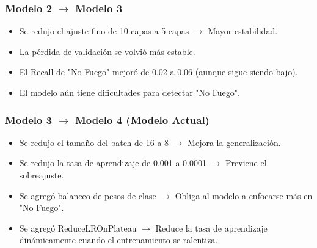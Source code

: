 \subsubsection{Modelo 2 $\rightarrow$ Modelo 3}
\begin{itemize}
    \item Se redujo el ajuste fino de 10 capas a 5 capas $\rightarrow$ Mayor estabilidad.
    \item La pérdida de validación se volvió más estable.
    \item El Recall de "No Fuego" mejoró de 0.02 a 0.06 (aunque sigue siendo bajo).
    \item El modelo aún tiene dificultades para detectar "No Fuego".
\end{itemize}

\subsubsection{Modelo 3 $\rightarrow$ Modelo 4 (Modelo Actual)}
\begin{itemize}
    \item Se redujo el tamaño del batch de 16 a 8 $\rightarrow$ Mejora la generalización.
    \item Se redujo la tasa de aprendizaje de 0.001 a 0.0001 $\rightarrow$ Previene el sobreajuste.
    \item Se agregó balanceo de pesos de clase $\rightarrow$ Obliga al modelo a enfocarse más en "No Fuego".
    \item Se agregó ReduceLROnPlateau $\rightarrow$ Reduce la tasa de aprendizaje dinámicamente cuando el entrenamiento se ralentiza.
\end{itemize}
